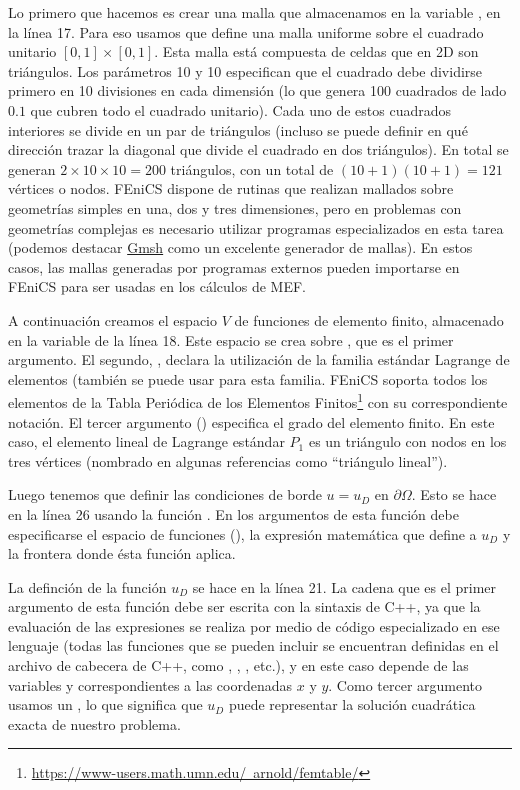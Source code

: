 Lo primero que hacemos es crear una malla que almacenamos en la variable , en la línea 17. Para eso usamos  que define una malla uniforme sobre el cuadrado unitario $[0,1] \times [0,1]$. Esta malla está compuesta de celdas que en 2D son triángulos. Los parámetros 10 y 10 especifican que el cuadrado debe dividirse primero en 10 divisiones en cada dimensión (lo que genera 100 cuadrados de lado $0.1$ que cubren todo el cuadrado unitario). Cada uno de estos cuadrados interiores se divide en un par de triángulos (incluso se puede definir en qué dirección trazar la diagonal que divide el cuadrado en dos triángulos). En total se generan $2 \times 10 \times 10 = 200$ triángulos, con un total de $(10 + 1) (10 + 1) = 121$ vértices o nodos. FEniCS dispone de rutinas que realizan mallados sobre geometrías simples en una, dos y tres dimensiones, pero en problemas con geometrías complejas es necesario utilizar programas especializados en esta tarea (podemos destacar \href{https://gmsh.info/}{Gmsh} como un excelente generador de mallas). En estos casos, las mallas generadas por programas externos pueden importarse en FEniCS para ser usadas en los cálculos de MEF.

A continuación creamos el espacio $V$ de funciones de elemento finito, almacenado en la variable  de la línea 18. Este espacio se crea sobre , que es el primer argumento. El segundo, , declara la utilización de la familia estándar Lagrange de elementos (también se puede usar  para esta familia. FEniCS soporta todos los elementos de la Tabla Periódica de los Elementos Finitos\footnote{\href{https://www-users.math.umn.edu/~arnold/femtable/}{https://www-users.math.umn.edu/~arnold/femtable/}} \cite{arnold2014} con su correspondiente notación. El tercer argumento () especifica el grado del elemento finito. En este caso, el elemento lineal de Lagrange estándar $P_1$ es un triángulo con nodos en los tres vértices (nombrado en algunas referencias como ``triángulo lineal''). 

Luego tenemos que definir las condiciones de borde $u = u_D$ en $\partial \Omega$. Esto se hace en la línea 26 usando la función . En los argumentos de esta función debe especificarse el espacio de funciones (), la expresión matemática que define a $u_D$ y la frontera donde ésta función aplica. 

La definción de la función $u_D$ se hace en la línea 21. La cadena que es el primer argumento de esta función debe ser escrita con la sintaxis de C++, ya que la evaluación de las expresiones se realiza por medio de código especializado en ese lenguaje (todas las funciones que se pueden incluir se encuentran definidas en el archivo de cabecera  de C++, como , , , etc.), y en este caso depende de las variables  y  correspondientes a las coordenadas $x$ y $y$. Como tercer argumento usamos un , lo que significa que $u_D$ puede representar la solución cuadrática exacta de nuestro problema.

